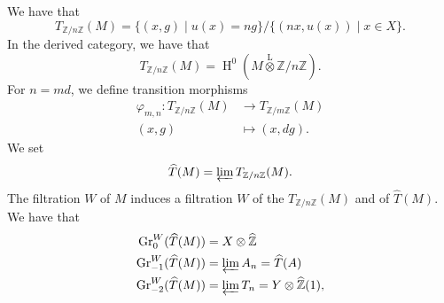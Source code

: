     We have that
    \[       T_{\mathbb {Z}{/}n\mathbb {Z}}(M)       = \big \{ (x,g) \mid  u(x)=ng \big \} / \big \{ (nx,u(x)) \mid  x\in  X \big \}.     \]
    In the derived category, we have that
    \[       T_{\mathbb {Z}{/}n\mathbb {Z}}(M)       = \operatorname {H}^0(M\overset {\mathrm {L}}{\otimes }\mathbb {Z}{/}n\mathbb {Z}).     \]
    For \(n=md\), we define transition morphisms
    \[       \begin {aligned}         \varphi _{m,n}\colon  T_{\mathbb {Z}{/}n\mathbb {Z}}(M)         &\to  T_{\mathbb {Z}{/}m\mathbb {Z}}(M)       \\(x,g)         &\mapsto  (x,dg).       \end {aligned}     \]
    We set
    \[       \widehat {T}(M)       = \varprojlim  T_{\mathbb {Z}{/}n\mathbb {Z}}(M).     \]
    The filtration \(W\) of \(M\) induces a filtration \(W\) of the \(T_{\mathbb {Z}{/}n\mathbb {Z}}(M)\) and of \(\widehat {T}(M)\).
    We have that
    \[       \begin {aligned}         \operatorname {Gr}_0^W(\widehat {T}(M))         &= X\otimes \widehat {\mathbb {Z}}       \\\operatorname {Gr}_{-1}^W(\widehat {T}(M))         &= \varprojlim  A_n         = \widehat {T}(A)       \\\operatorname {Gr}_{-2}^W(\widehat {T}(M))         &= \varprojlim  T_n         = Y\otimes \widehat {\mathbb {Z}}(1),       \end {aligned}     \]
